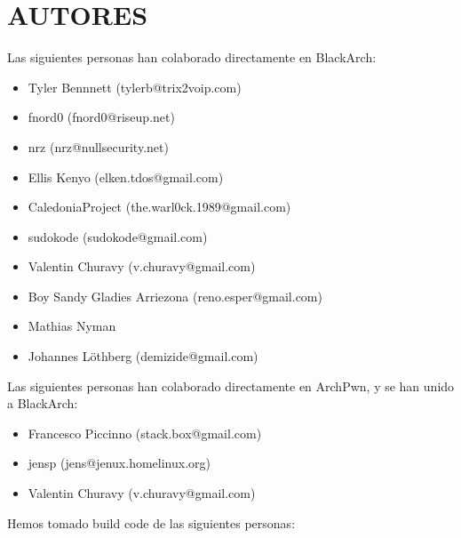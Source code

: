 \section{AUTORES}
Las siguientes personas han colaborado directamente en BlackArch:
\begin{itemize}
\item Tyler Bennnett (tylerb@trix2voip.com)
\item fnord0 (fnord0@riseup.net)
\item nrz (nrz@nullsecurity.net)
\item Ellis Kenyo (elken.tdos@gmail.com)
\item CaledoniaProject (the.warl0ck.1989@gmail.com)
\item sudokode (sudokode@gmail.com)
\item Valentin Churavy (v.churavy@gmail.com)
\item Boy Sandy Gladies Arriezona (reno.esper@gmail.com)
\item Mathias Nyman
\item Johannes Löthberg (demizide@gmail.com)
\end{itemize}
Las siguientes personas han colaborado directamente en ArchPwn, 
y se han unido a BlackArch:
\begin{itemize}
\item Francesco Piccinno (stack.box@gmail.com)
\item jensp (jens@jenux.homelinux.org)
\item Valentin Churavy (v.churavy@gmail.com)
\end{itemize}
Hemos tomado build code de las siguientes personas:
